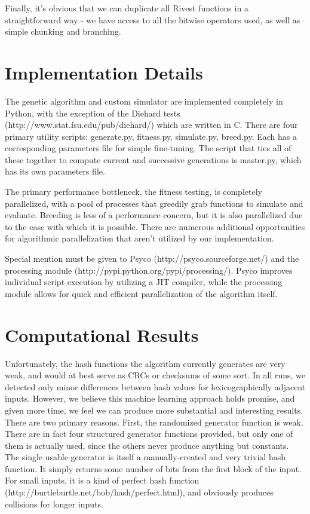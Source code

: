 \documentclass{article}
\begin{document}
Finally, it's obvious that we can duplicate all Rivest functions in a straightforward way - we have access to all the bitwise operators used, as well as simple chunking and branching.

\section{Implementation Details}
The genetic algorithm and custom simulator are implemented completely in Python, with the exception of the Diehard tests (http://www.stat.fsu.edu/pub/diehard/) which are written in C. There are four primary utility scripts: generate.py, fitness.py, simulate.py, breed.py. Each has a corresponding parameters file for simple fine-tuning. The script that ties all of these together to compute current and successive generations is master.py, which has its own parameters file.

The primary performance bottleneck, the fitness testing, is completely parallelized, with a pool of processes that greedily grab functions to simulate and evaluate. Breeding is less of a performance concern, but it is also parallelized due to the ease with which it is possible. There are numerous additional opportunities for algorithmic parallelization that aren't utilized by our implementation.

Special mention must be given to Psyco (http://psyco.sourceforge.net/) and the processing module (http://pypi.python.org/pypi/processing/). Psyco improves individual script execution by utilizing a JIT compiler, while the processing module allows for quick and efficient parallelization of the algorithm itself.

\section{Computational Results}

Unfortunately, the hash functions the algorithm currently generates are very weak, and would at best serve as CRCs or checksums of some sort. In all runs, we detected only minor differences between hash values for lexicographically adjacent inputs. However, we believe this machine learning approach holds promise, and given more time, we feel we can produce more substantial and interesting results. There are two primary reasons. First, the randomized generator function is weak. There are in fact four structured generator functions provided, but only one of them is actually used, since the others never produce anything but constants. The single usable generator is itself a manually-created and very trivial hash function. It simply returns some number of bits from the first block of the input. For small inputs, it is a kind of perfect hash function (http://burtleburtle.net/bob/hash/perfect.html), and obviously produces collisions for longer inputs.
\end{document}
